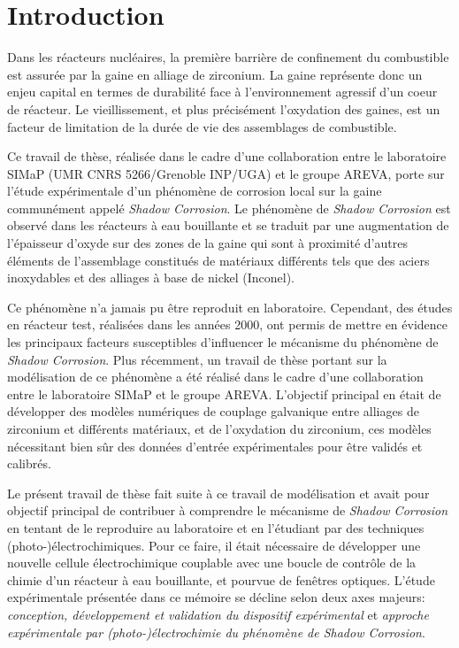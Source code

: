 
\chapter*{Introduction}\label{chap:introduction}
{}

Dans les réacteurs nucléaires, la première barrière de confinement du combustible est assurée par la gaine en alliage 
de zirconium. La gaine représente donc un enjeu capital en termes de durabilité face à l'environnement agressif
d'un coeur de réacteur. Le vieillissement, et plus précisément l'oxydation des gaines, est un facteur de limitation de la durée de
vie des assemblages de combustible.

Ce travail de thèse, réalisée dans le cadre d'une collaboration entre le laboratoire
SIMaP (UMR CNRS 5266/Grenoble INP/UGA) et le groupe AREVA, porte sur l'étude expérimentale d'un phénomène de corrosion local sur la gaine
communément appelé \emph{Shadow Corrosion}. Le phénomène de \emph{Shadow Corrosion} est observé dans les réacteurs à eau
bouillante et se traduit par une augmentation de l’épaisseur d’oxyde sur des zones de la gaine qui sont à
proximité d’autres éléments de l’assemblage constitués de matériaux différents tels que des aciers inoxydables et des
alliages à base de nickel (Inconel). 

Ce phénomène n'a jamais pu être reproduit en laboratoire.
Cependant, des études en réacteur test, réalisées dans les années 2000, ont permis de mettre en évidence les principaux
facteurs susceptibles d'influencer le mécanisme du phénomène de \emph{Shadow Corrosion}. Plus récemment, un travail de thèse
portant sur la modélisation  de ce phénomène a été réalisé dans le cadre d'une collaboration entre le laboratoire SIMaP
et le groupe AREVA. L'objectif principal en était de développer des modèles numériques de
couplage galvanique entre alliages de zirconium et différents matériaux, et de l'oxydation du zirconium, ces modèles nécessitant bien sûr des données d'entrée expérimentales pour être validés et calibrés.

Le présent travail de thèse fait suite à ce travail de modélisation et avait pour objectif principal de contribuer à comprendre
 le mécanisme de \emph{Shadow Corrosion} en tentant de le reproduire au laboratoire et en l'étudiant par des techniques 
(photo-)électrochimiques.
Pour ce faire, il était nécessaire de développer une nouvelle cellule électrochimique couplable avec une boucle 
de contrôle de la chimie d'un réacteur à eau bouillante, et pourvue de fenêtres optiques.
L'étude expérimentale présentée dans ce mémoire se décline
selon deux axes majeurs: \emph{conception, développement et validation du dispositif expérimental} et \emph{approche expérimentale par
(photo-)électrochimie du phénomène de Shadow Corrosion}.

